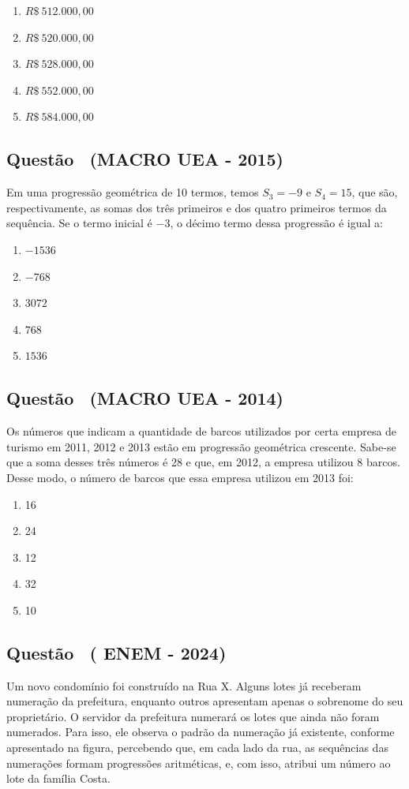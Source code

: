 \documentclass[12pt]{article}
\newcounter{questao}
\newcommand{\novaquestao}[1]{%
  \stepcounter{questao}%
  \subsection*{Questão \thequestao\ (#1)}%
}
\begin{document}
\begin{multicols}{2}
        
            \begin{enumerate}[label=(\alph*), noitemsep]
                \item $R\$\ 512.000,00$
                \item $R\$\ 520.000,00$
                \item $R\$\ 528.000,00$
                \item $R\$\ 552.000,00$
                \item $R\$\ 584.000,00$
            \end{enumerate}

        \novaquestao{MACRO UEA - 2015}
            Em uma progressão geométrica de 10 termos, temos $S_{3}= -9$ e $S_{4}= 15$, que são, respectivamente, as somas dos três primeiros e dos quatro primeiros termos da sequência. Se o termo inicial é $-3$, o décimo termo dessa progressão é igual a:
        
            \begin{enumerate}[label=(\alph*), noitemsep]
                \item $-1536$
                \item $-768$
                \item $3072$
                \item $768$
                \item $1536$
            \end{enumerate}

        \novaquestao{MACRO UEA - 2014}
            Os números que indicam a quantidade de barcos utilizados por certa empresa de turismo em 2011, 2012 e 2013 estão em progressão geométrica crescente. Sabe-se que a soma desses três números é 28 e que, em 2012, a empresa utilizou 8 barcos. Desse modo, o número de barcos que essa empresa utilizou em 2013 foi:

            \begin{enumerate}[label=(\alph*), noitemsep]
                \item 16
                \item 24
                \item 12
                \item 32
                \item 10 
            \end{enumerate}
        

        \novaquestao{ ENEM - 2024}
            Um novo condomínio foi construído na Rua X. Alguns lotes já receberam numeração da prefeitura, enquanto outros apresentam apenas o sobrenome do seu proprietário. O servidor da prefeitura numerará os lotes que ainda não foram numerados. Para isso, ele observa o padrão da numeração já existente, conforme apresentado na figura, percebendo que, em cada lado da rua, as sequências das numerações formam progressões aritméticas, e, com isso, atribui um número ao lote da família Costa.


\end{multicols}
\end{document}
